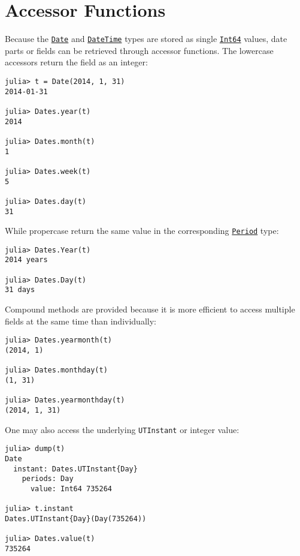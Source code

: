 \hypertarget{15274886386548419130}{}


\section{Accessor Functions}



Because the \hyperlink{4488183467971164548}{\texttt{Date}} and \hyperlink{17572689933274889838}{\texttt{DateTime}} types are stored as single \hyperlink{7720564657383125058}{\texttt{Int64}} values, date parts or fields can be retrieved through accessor functions. The lowercase accessors return the field as an integer:




\begin{verbatim}
julia> t = Date(2014, 1, 31)
2014-01-31

julia> Dates.year(t)
2014

julia> Dates.month(t)
1

julia> Dates.week(t)
5

julia> Dates.day(t)
31
\end{verbatim}



While propercase return the same value in the corresponding \hyperlink{17624028548543163266}{\texttt{Period}} type:




\begin{verbatim}
julia> Dates.Year(t)
2014 years

julia> Dates.Day(t)
31 days
\end{verbatim}



Compound methods are provided because it is more efficient to access multiple fields at the same time than individually:




\begin{verbatim}
julia> Dates.yearmonth(t)
(2014, 1)

julia> Dates.monthday(t)
(1, 31)

julia> Dates.yearmonthday(t)
(2014, 1, 31)
\end{verbatim}



One may also access the underlying \texttt{UTInstant} or integer value:




\begin{verbatim}
julia> dump(t)
Date
  instant: Dates.UTInstant{Day}
    periods: Day
      value: Int64 735264

julia> t.instant
Dates.UTInstant{Day}(Day(735264))

julia> Dates.value(t)
735264
\end{verbatim}



